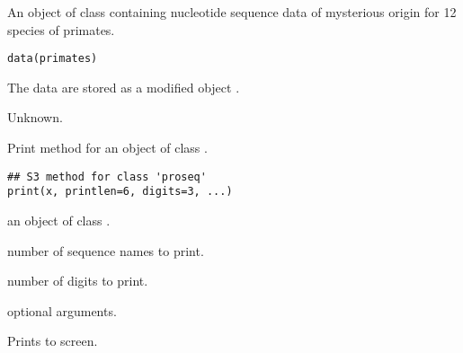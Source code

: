 \documentclass[a4paper]{book}
\begin{document}
%
\begin{Examples}
\end{Examples}
%
\begin{Description}\relax
An object of class  containing nucleotide sequence data of mysterious origin for 12 species of primates.
\end{Description}
%
\begin{Usage}
\begin{verbatim}
data(primates)
\end{verbatim}
\end{Usage}
%
\begin{Format}
The data are stored as a modified object .
\end{Format}
%
\begin{Source}\relax
Unknown.
\end{Source}
%
\begin{Description}\relax
Print method for an object of class .
\end{Description}
%
\begin{Usage}
\begin{verbatim}
## S3 method for class 'proseq'
print(x, printlen=6, digits=3, ...)
\end{verbatim}
\end{Usage}
%
\begin{Arguments}
\begin{ldescription}
\item[\code{x}] an object of class .
\item[\code{printlen}] number of sequence names to print.
\item[\code{digits}] number of digits to print.
\item[\code{...}] optional arguments.
\end{ldescription}
\end{Arguments}
%
\begin{Value}
Prints to screen.
\end{Value}
\end{document}
